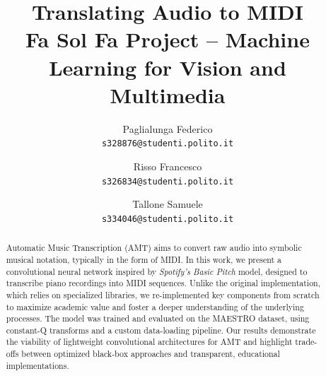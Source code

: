 \documentclass[10pt,twocolumn,letterpaper]{article}
\begin{document}
\title{Translating Audio to MIDI\\ \vspace{0.1cm}\normalsize Fa Sol Fa Project -- Machine Learning for Vision and Multimedia}

\author{Paglialunga Federico\\
{\tt\small s328876@studenti.polito.it}
\and
Risso Francesco\\
{\tt\small s326834@studenti.polito.it}
\and
Tallone Samuele\\
{\tt\small s334046@studenti.polito.it}
}

\maketitle

\begin{abstract}
Automatic Music Transcription (AMT) aims to convert raw audio into symbolic musical notation, typically in the form of MIDI. In this work, we present a convolutional neural network inspired by \textit{Spotify’s Basic Pitch} model, designed to transcribe piano recordings into MIDI sequences. Unlike the original implementation, which relies on specialized libraries, we re-implemented key components from scratch to maximize academic value and foster a deeper understanding of the underlying processes.
The model was trained and evaluated on the MAESTRO dataset, using constant-Q transforms and a custom data-loading pipeline. Our results demonstrate the viability of lightweight convolutional architectures for AMT and highlight trade-offs between optimized black-box approaches and transparent, educational implementations. 

\end{abstract}
\end{document}

